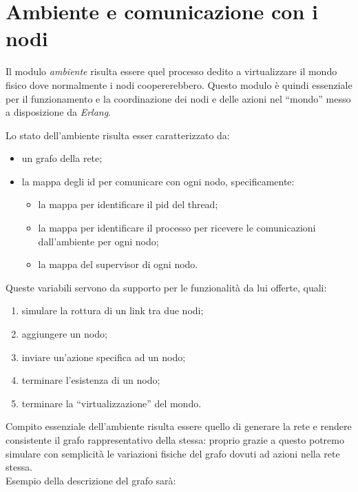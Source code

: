 \documentclass[italian]{memoir}
\begin{document}
\section{Ambiente e comunicazione con i nodi}
Il modulo \textit{ambiente} risulta essere quel processo dedito a virtualizzare il mondo fisico dove normalmente i nodi coopererebbero. Questo modulo è quindi essenziale per il funzionamento e la coordinazione dei nodi e delle azioni nel ``mondo'' messo a disposizione da \textit{Erlang}.

Lo stato dell'ambiente risulta esser caratterizzato da:
\begin{itemize}
    \item un grafo della rete;
    \item la mappa degli id per comunicare con ogni nodo, specificamente:
    \begin{itemize}
        \item la mappa per identificare il pid del thread;
        \item la mappa per identificare il processo per ricevere le comunicazioni dall'ambiente per ogni nodo;
        \item la mappa del supervisor di ogni nodo.
    \end{itemize}
\end{itemize}
Queste variabili servono da supporto per le funzionalità da lui offerte, quali:
\begin{enumerate}
    \item simulare la rottura di un link tra due nodi;
    \item aggiungere un nodo;
    \item inviare un'azione specifica ad un nodo;
    \item terminare l'esistenza di un nodo;
    \item terminare la ``virtualizzazione'' del mondo.
\end{enumerate}
Compito essenziale dell'ambiente risulta essere quello di generare la rete e rendere consistente il grafo rappresentativo della stessa: proprio grazie a questo potremo simulare con semplicità le variazioni fisiche del grafo dovuti ad azioni nella rete stessa.\\
Esempio della descrizione del grafo sarà:
\end{document}
